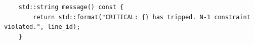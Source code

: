 \begin{verbatim}
    std::string message() const {
        return std::format("CRITICAL: {} has tripped. N-1 constraint violated.", line_id);
    }
\end{verbatim}

